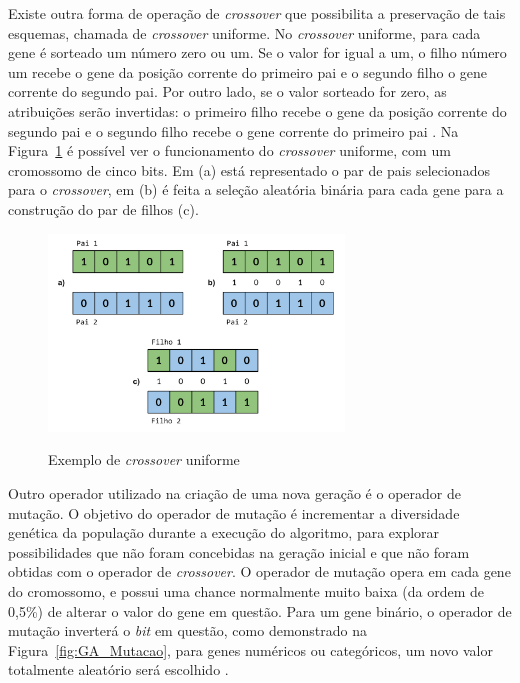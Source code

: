 \documentclass[12pt,oneside,a4paper,english,french,spanish,brazil,]{abntex2}
\begin{document}
Existe outra forma de operação de \textit{crossover} que possibilita a preservação de tais esquemas, chamada de \textit{crossover} uniforme. No \textit{crossover} uniforme, para cada gene é sorteado um número zero ou um. Se o valor for igual a um, o filho número um recebe o gene da posição corrente do primeiro pai e o segundo filho o gene corrente do segundo pai. Por outro lado, se o valor sorteado for zero, as atribuições serão invertidas: o primeiro filho recebe o gene da posição corrente do segundo pai e o segundo filho recebe o gene corrente do primeiro pai \cite{linden:2008}. Na Figura~\ref{fig:GA_Crossover_Uniforme} é possível ver o funcionamento do \textit{crossover} uniforme, com um cromossomo de cinco bits. Em (a) está representado o par de pais selecionados para o \textit{crossover}, em (b) é feita a seleção aleatória binária para cada gene para a construção do par de filhos (c).

\begin{figure}[ht]
\centering
\caption{Exemplo de \textit{crossover} uniforme}
\includegraphics[width=0.7\textwidth]{imagens/GA_Crossover_Uniforme.pdf}
\label{fig:GA_Crossover_Uniforme}
\end{figure}

Outro operador utilizado na criação de uma nova geração é o operador de mutação. O objetivo do operador de mutação é incrementar a diversidade genética da população durante a execução do algoritmo, para explorar possibilidades que não foram concebidas na geração inicial e que não foram obtidas com o operador de \textit{crossover}. O operador de mutação opera em cada gene do cromossomo, e possui uma chance normalmente muito baixa (da ordem de 0,5\%) de alterar o valor do gene em questão. Para um gene binário, o operador de mutação inverterá o \textit{bit} em questão, como demonstrado na Figura~\ref{fig:GA_Mutacao}, para genes numéricos ou categóricos, um novo valor totalmente aleatório será escolhido \cite{linden:2008}.
\end{document}
